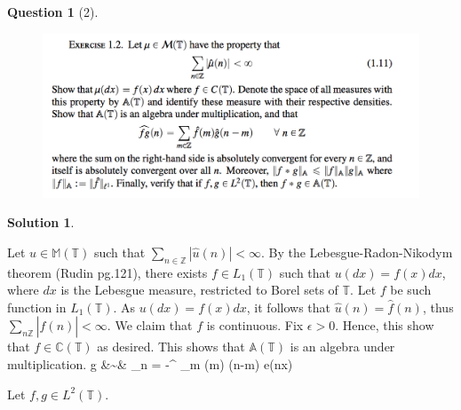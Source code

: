 \documentclass{article} %
\def\eQb#1\eQe{\begin{eqnarray*}#1\end{eqnarray*}}
\theoremstyle{quest}
\newtheorem*{question}{Question}
\newtheorem*{solution}{Solution}
\begin{document}
\begin{question}[2]
\hfill
\begin{figure}[h!]
  \centering
    \includegraphics[width=1\textwidth]{HA-1-2.png}
\end{figure}
\end{question}
\begin{solution}

\end{solution}
Let $u \in \mathbb{M}(\mathbb{T})$ 
such that $\sum_{n \in \mathbb{Z}} |\hat{u}(n)| < \infty$. By the Lebesgue-Radon-Nikodym
theorem (Rudin pg.121), there exists $f \in L_1(\mathbb{T})$ such that $u(dx) = f(x)dx$,
where $dx$ is the Lebesgue measure, restricted to Borel sets of $\mathbb{T}$. Let $f$ be
such function in $L_1(\mathbb{T})$. As 
$u(dx) = f(x)dx$, it follows that $\hat{u}(n) = \hat{f}(n)$, thus $\sum_{n \mathbb{Z}} 
|\hat{f}(n)| < \infty$. We claim that $f$ is continuous. Fix $\epsilon > 0$. Hence,
this show that $f \in \mathbb{C}(\mathbb{T})$ as desired. This shows that
$\mathbb{A}(\mathbb{T})$ is an algebra under multiplication. 
\eQb
fg &\sim& \sum_{n = -\infty}^{\infty} \sum_{m \in {}} (m) (n-m) e(nx)   
\eQe

Let $f,g \in L^{2}(\mathbb{T})$. 
\newpage
\end{document}
